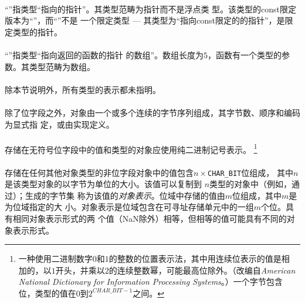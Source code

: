 \paragraph{}
\ex ``''指类型``指向的指针''。其类型范畴为指针而不是浮点类
型。该类型的const限定版本为``''，而``''不是
一个限定类型 --- 其类型为``指向const限定的的指针''，是限定类型的指针。

\paragraph{}
\ex ``''指类型``指向返回的函数的指针
的数组''。数组长度为$5$，函数有一个类型的参数。其类型范畴为数组。


\paragraph{}
除本节说明外，所有类型的表示都未指明。

\paragraph{}
除了位字段之外，对象由一个或多个连续的字节序列组成，其字节数、顺序和编码为显式指
定，或由实现定义。

\paragraph{}
存储在无符号位字段中的值和类型的对象应使用纯二进制记号表示。
\footnote{一种使用二进制数字$0$和$1$的整数的位置表示法，其中用连续位表示的值是相
加的，以$1$开头，并乘以$2$的连续整数幂，可能最高位除外。（改编自\textit{American
National Dictionary for Information Processing Systems}。）一个字节包含
位，类型的值在$0$到$2^{CHAR\_BIT-1}$之间。}

\paragraph{}
存储在任何其他对象类型的非位字段对象中的值包含$n\times$\texttt{CHAR\_BIT}位组成，
其中$n$是该类型对象的以字节为单位的大小。该值可以复制到
\tm{unsigned char[}$n$\tm{]}类型的对象中（例如，通过）；生成的字节集
称为该值的\textit{对象表示}。位域中存储的值由$m$位组成，其中$m$是为位域指定的大
小。对象表示是位域包含在可寻址存储单元中的一组$m$个位。具有相同对象表示形式的两
个值（NaN除外）相等，但相等的值可能具有不同的对象表示形式。

